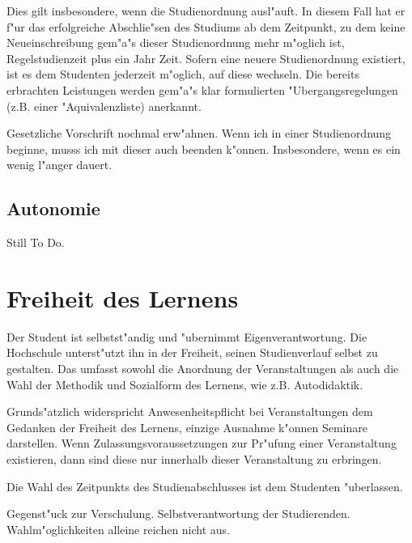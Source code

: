 Dies gilt insbesondere, wenn die Studienordnung ausl"auft.
In diesem Fall hat er f"ur das erfolgreiche Abschlie"sen des Studiums ab dem Zeitpunkt, zu dem keine Neueinschreibung gem"a"s dieser Studienordnung mehr m"oglich ist, Regelstudienzeit plus ein Jahr Zeit.
Sofern eine neuere Studienordnung existiert, ist es dem Studenten jederzeit m"oglich, auf diese wechseln.
Die bereits erbrachten Leistungen werden gem"a"s klar formulierten "Ubergangsregelungen (z.B. einer "Aquivalenzliste) anerkannt.

\begin{kcmt}\begin{komacmt}
	Gesetzliche Vorschrift nochmal erw"ahnen. Wenn ich in einer Studienordnung 
	beginne, musss ich mit dieser auch beenden k"onnen. Insbesondere, wenn es ein wenig l"anger dauert.
\end{komacmt}\end{kcmt}

\begin{stilltodo}
\section{Autonomie}

{\Large{Still To Do.}}
\end{stilltodo}

\section{Freiheit des Lernens}

Der Student ist selbstst"andig und "ubernimmt Eigenverantwortung. Die Hochschule
unterst"utzt ihn in der Freiheit, seinen Studienverlauf selbst zu gestalten.
Das umfasst sowohl die Anordnung der Veranstaltungen als auch die Wahl der Methodik
und Sozialform des Lernens, wie z.B. Autodidaktik.

Grunds"atzlich widerspricht Anwesenheitspflicht bei Veranstaltungen dem Gedanken
der Freiheit des Lernens, einzige Ausnahme k"onnen Seminare darstellen. Wenn Zulassungsvoraussetzungen
zur Pr"ufung einer Veranstaltung existieren, dann sind diese nur innerhalb dieser
Veranstaltung zu erbringen.

Die Wahl des Zeitpunkts des Studienabschlusses ist dem Studenten "uberlassen.

\begin{kcmt}\begin{komacmt}
	Gegenst"uck zur Verschulung. Selbstverantwortung der Studierenden. Wahlm"oglichkeiten alleine reichen nicht aus.
\end{komacmt}\end{kcmt}


